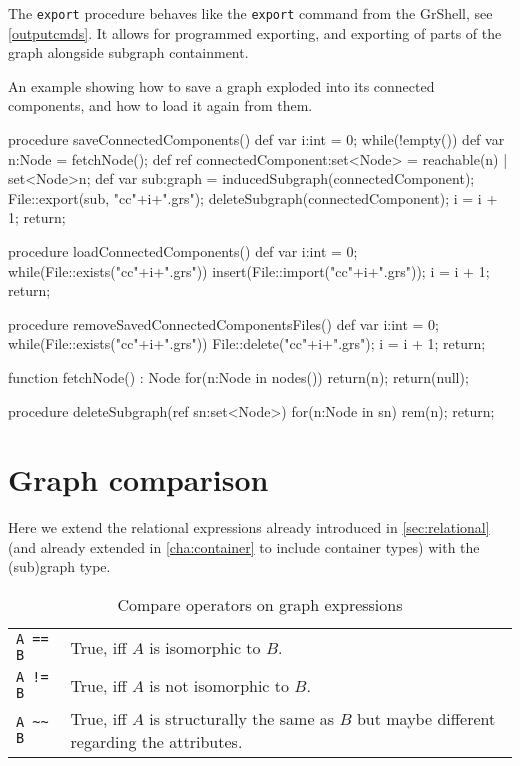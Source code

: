 The \texttt{export} procedure behaves like the \texttt{export} command from the GrShell, see \ref{outputcmds}. It allows for programmed exporting, and exporting of parts of the graph alongside subgraph containment.


\begin{example}
An example showing how to save a graph exploded into its connected components, and how to load it again from them.
\begin{grgen}
procedure saveConnectedComponents()
{
	def var i:int = 0;
	while(!empty()) {
		def var n:Node = fetchNode();
		def ref connectedComponent:set<Node> = reachable(n) | set<Node>{n};
		def var sub:graph = inducedSubgraph(connectedComponent);
		File::export(sub, "cc"+i+".grs");
		deleteSubgraph(connectedComponent);
		i = i + 1;
	}
	return;
}

procedure loadConnectedComponents()
{
	def var i:int = 0;
	while(File::exists("cc"+i+".grs")) {
		insert(File::import("cc"+i+".grs"));
		i = i + 1;
	}
	return;
}

procedure removeSavedConnectedComponentsFiles()
{
	def var i:int = 0;
	while(File::exists("cc"+i+".grs")) {
		File::delete("cc"+i+".grs");
		i = i + 1;
	}
	return;
}

function fetchNode() : Node
{
	for(n:Node in nodes()) {
		return(n);
	}
	return(null);
}

procedure deleteSubgraph(ref sn:set<Node>)
{
	for(n:Node in sn) {
		rem(n);
	}
	return;
}
\end{grgen}
\end{example}


\section{Graph comparison}\label{sec:relationalgraph}

Here we extend the relational expressions already introduced in \ref{sec:relational} (and already extended in \ref{cha:container} to include container types) with the (sub)graph type.

\begin{table}[htbp]
  \centering
  \begin{tabularx}{\linewidth}{|l|X|} \hline
    \texttt{A == B} & True, iff $A$ is isomorphic to $B$. \\
    \texttt{A != B} & True, iff $A$ is not isomorphic to $B$. \\
    \texttt{A \textasciitilde\textasciitilde{} B} & True, iff $A$ is structurally the same as $B$ but maybe different regarding the attributes. \\ \hline
  \end{tabularx}
  \caption{Compare operators on graph expressions}
  \label{compandgraph}
\end{table}

